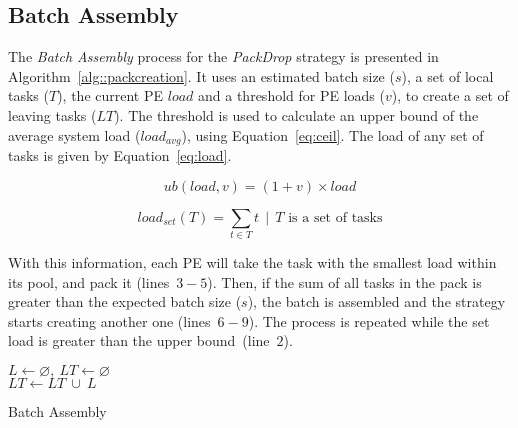 \subsection{Batch Assembly} \label{sec:algo:creation}

The \textit{Batch Assembly} process for the \textit{PackDrop} strategy is presented in Algorithm~\ref{alg::packcreation}.
It uses an estimated batch size ($s$), a set of local tasks ($T$), the current PE $load$ and a threshold for PE loads ($v$), to create a set of leaving tasks ($LT$).
The threshold is used to calculate an upper bound of the average system load ($load_{avg}$), using Equation~\ref{eq:ceil}. 
The load of any set of tasks is given by Equation~\ref{eq:load}.

\begin{equation}
	ub(load,v) = (1+v)\times load
    \label{eq:ceil}
\end{equation}

\begin{equation}
	load_{set}(T) = \sum_{t \in T}t\ \ |\ \ T \text{ is a set of tasks}
	\label{eq:load}
\end{equation}

With this information, each PE will take the task with the smallest load within its pool, and pack it (lines~$3-5$).
Then, if the sum of all tasks in the pack is greater than the expected batch size ($s$), the batch is assembled and the strategy starts creating another one (lines~$6-9$).
The process is repeated while the set load is greater than the upper bound~(line~$2$).


\begin{algorithm}[!ht]
    \DontPrintSemicolon
    $L \gets \varnothing,\ LT \gets \varnothing$ \\
    $LT \gets LT\ \cup\ L$   
    \caption{Batch Assembly} 
    \label{alg::packcreation}
\end{algorithm}

